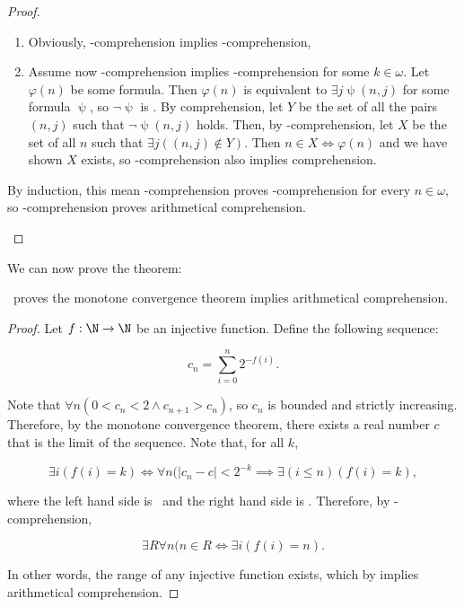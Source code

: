 \documentclass[../main.tex]{memoir}
\begin{document}
\begin{proof}
\begin{description}
    \begin{enumerate}
    \item Obviously, \re-comprehension implies -comprehension,
    \item Assume now \re-comprehension implies -comprehension for some $k \in \omega$. Let $\varphi(n)$ be some  formula. Then $\varphi(n)$ is equivalent to $\exists j \uppsi(n, j)$ for some  formula $\uppsi$, so $\neg \uppsi$ is . By  comprehension, let $Y$ be the set of all the pairs $(n, j)$ such that $\neg \uppsi(n, j)$ holds. Then, by \re-comprehension, let $X$ be the set of all $n$ such that $\exists j ((n, j) \not\in Y)$. Then $n \in X \iff \varphi(n)$ and we have shown $X$ exists, so \re-comprehension also implies  comprehension.
    \end{enumerate}

    By induction, this mean \re-comprehension proves -comprehension for every $n \in \omega$, so \re-comprehension proves arithmetical comprehension.
  \end{description}
\end{proof}

We can now prove the theorem:

\begin{theorem}
  \label{thm:mc-aca}
  \rca\ proves the monotone convergence theorem implies arithmetical comprehension.
\end{theorem}
\begin{proof}
  Let $f:\N \to \N$ be an injective function. Define the following sequence:

  \[ c_n = \sum_{i = 0}^n 2^{-f(i)}. \]

  Note that $\forall n (0 < c_n < 2 \land c_{n + 1} > c_n)$, so $c_n$ is bounded and strictly increasing. Therefore, by the monotone convergence theorem, there exists a real number $c$ that is the limit of the sequence. Note that, for all $k$,

  \[ \exists i (f(i) = k) \iff \forall n (|c_n - c| < 2^{-k} \implies \exists (i \le n) (f(i) = k), \]

  where the left hand side is \re\ and the right hand side is \core. Therefore, by \rec-comprehension,

  \[ \exists R \forall n (n \in R \iff \exists i (f(i) = n). \]

  In other words, the range of any injective function exists, which by  implies arithmetical comprehension.
\end{proof}
\end{document}
